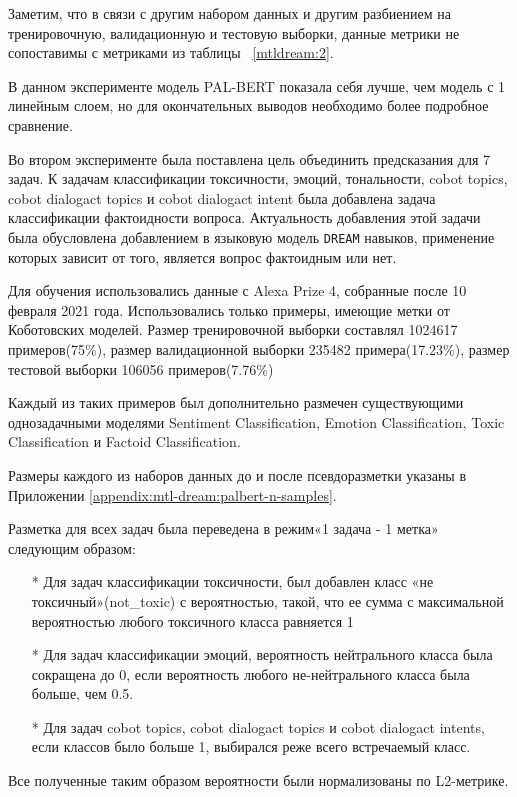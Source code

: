 Заметим, что в связи с другим набором данных и другим разбиением на тренировочную, валидационную и тестовую выборки, данные метрики не сопоставимы с метриками из таблицы ~\ref{mtldream:2}.
 
В данном эксперименте модель PAL-BERT показала себя лучше, чем модель с 1 линейным слоем, но для окончательных выводов необходимо более подробное сравнение.

Во втором эксперименте была поставлена цель объединить предсказания для 7 задач. К задачам классификации токсичности, эмоций, тональности, cobot topics, cobot dialogact topics и cobot dialogact intent была добавлена задача классификации фактоидности вопроса. Актуальность добавления этой задачи была обусловлена добавлением в языковую модель \texttt{DREAM} навыков, применение которых зависит от того, является вопрос фактоидным или нет.

Для обучения использовались данные с Alexa Prize 4, собранные после 10 февраля 2021 года. Использовались только примеры, имеющие метки от Коботовских моделей. Размер тренировочной выборки составлял 1024617 примеров(75\%), размер валидационной выборки 235482 примера(17.23\%), размер тестовой выборки 106056 примеров(7.76\%)

Каждый из таких примеров был дополнительно размечен существующими однозадачными моделями Sentiment Classification, Emotion Classification, Toxic Classification и Factoid Classification.

Размеры каждого из наборов данных до и после псевдоразметки указаны в Приложении \ref{appendix:mtl-dream:palbert-n-samples}. 

Разметка для всех задач была переведена в режим«1 задача - 1 метка» следующим образом:
\begin{itemize}
\item[*] Для задач классификации токсичности, был добавлен класс «не токсичный»({not\_toxic}) с вероятностью, такой, что ее сумма с максимальной вероятностью любого токсичного класса равняется 1
\item[*] Для задач классификации эмоций, вероятность нейтрального класса была сокращена до 0, если вероятность любого не-нейтрального класса была больше, чем 0.5.
\item[*] Для задач cobot topics, cobot dialogact topics и cobot dialogact intents, если классов было больше 1, выбирался реже всего встречаемый класс.
\end{itemize}
Все полученные таким образом вероятности были нормализованы по L2-метрике.

